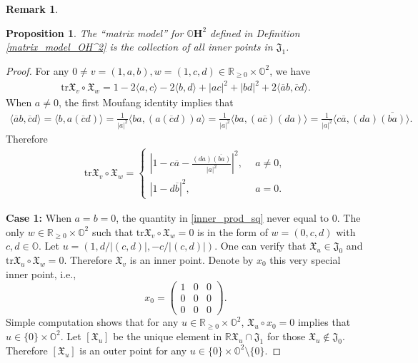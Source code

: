 \documentclass{article}
\newcommand{\ints}{\cap}
\newcommand{\OO}{\mathbb{O}}
\newcommand{\RR}{\mathbb{R}}
\newcommand{\tr}{\mathrm{tr}}
\newcommand{\FFJ}{\mathfrak{J}}
\newcommand{\FFX}{\mathfrak{X}}
\newcommand{\matiii}[3]{\left(\begin{array}{ccc} #1\\#2\\#3\end{array}\right)}
\newtheorem{prop}[thm]{Proposition}
\theoremstyle{definition}
\newtheorem*{rmk}{Remark}
\begin{document}
\begin{rmk}
\begin{prop}
The ``matrix model'' for $\OO\mathbf{H}^2$ defined in Definition \ref{matrix_model_OH^2} is the collection of all inner points in $\FFJ_1$.
\end{prop}
\begin{proof}
For any $0\neq v=(1,a,b),w=(1,c,d)\in\RR_{\geq 0}\times\OO^2$, we have
\begin{align*}
\tr\FFX_v\circ\FFX_w=1-2\langle a,c\rangle-2\langle b,d\rangle+|ac|^2+|bd|^2+2\langle \overline{a}b,\overline{c}d\rangle.
\end{align*}
When $a\neq 0$, the first Moufang identity implies that
\begin{align*}
\langle \overline{a}b,\overline{c}d\rangle=\langle b,a(\overline{c}d)\rangle=\frac{1}{|a|^2}\langle ba,(a(\overline{c}d))a\rangle=\frac{1}{|a|^2}\langle ba,(a\overline{c})(da)\rangle=\frac{1}{|a|^2}\langle c\overline{a},(da)\overline{(ba)}\rangle.
\end{align*}
Therefore
\begin{align}\label{inner_prod_sq}\tr\FFX_v\circ\FFX_w=
\begin{cases}
\displaystyle \left|1-c\overline{a}-\frac{(da)\overline{(ba)}}{|a|^2}\right|^2,~~& a\neq 0,\\
\displaystyle |1-d\overline{b}|^2, & a=0.
\end{cases}
\end{align}


\textbf{Case 1:} When $a=b=0$, the quantity in \eqref{inner_prod_sq} never equal to 0. The only $w\in\RR_{\geq 0}\times\OO^2$ such that $\tr\FFX_v\circ\FFX_w=0$ is in the form of $w=(0,c,d)$ with $c,d\in\OO$. Let $u=(1,d/|(c,d)|,-c/|(c,d)|)$. One can verify that $\FFX_u\in\FFJ_0$ and $\tr\FFX_u\circ\FFX_w=0$. Therefore $\FFX_v$ is an inner point. Denote by $x_0$ this very special inner point, i.e.,
 $$x_0=\matiii{1&0&0}{0&0&0}{0&0&0}.$$
Simple computation shows that for any $u\in\RR_{\geq 0}\times\OO^2$, $\FFX_u\circ x_0=0$ implies that $u\in\{0\} \times\OO^2$. Let $[\FFX_u]$ be the unique element in $\RR\FFX_u\ints \FFJ_1$ for those $\FFX_u\not\in\FFJ_0$.  Therefore $[\FFX_u]$ is an outer point for any $u\in\{0\}\times\OO^2\setminus \{0\}$.


\end{proof}
\end{rmk}
\end{document}
